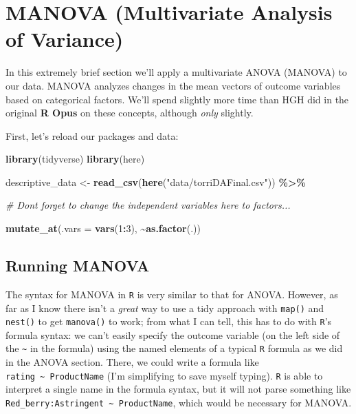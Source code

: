 \documentclass[
]{book}
\newenvironment{Shaded}{\begin{snugshade}}{\end{snugshade}}
\newcommand{\AttributeTok}[1]{\textcolor[rgb]{0.13,0.29,0.53}{#1}}
\newcommand{\CommentTok}[1]{\textcolor[rgb]{0.56,0.35,0.01}{\textit{#1}}}
\newcommand{\DecValTok}[1]{\textcolor[rgb]{0.00,0.00,0.81}{#1}}
\newcommand{\FunctionTok}[1]{\textcolor[rgb]{0.13,0.29,0.53}{\textbf{#1}}}
\newcommand{\NormalTok}[1]{#1}
\newcommand{\OtherTok}[1]{\textcolor[rgb]{0.56,0.35,0.01}{#1}}
\newcommand{\SpecialCharTok}[1]{\textcolor[rgb]{0.81,0.36,0.00}{\textbf{#1}}}
\newcommand{\StringTok}[1]{\textcolor[rgb]{0.31,0.60,0.02}{#1}}
\begin{document}
\chapter{MANOVA (Multivariate Analysis of Variance)}\label{manova-multivariate-analysis-of-variance}

In this extremely brief section we'll apply a multivariate ANOVA (MANOVA) to our data. MANOVA analyzes changes in the mean vectors of outcome variables based on categorical factors. We'll spend slightly more time than HGH did in the original \textbf{R Opus} on these concepts, although \emph{only} slightly.

First, let's reload our packages and data:

\begin{Shaded}
\begin{Highlighting}[]
\FunctionTok{library}\NormalTok{(tidyverse)}
\FunctionTok{library}\NormalTok{(here)}

\NormalTok{descriptive\_data }\OtherTok{\textless{}{-}} \FunctionTok{read\_csv}\NormalTok{(}\FunctionTok{here}\NormalTok{(}\StringTok{"data/torriDAFinal.csv"}\NormalTok{)) }\SpecialCharTok{\%\textgreater{}\%}
  
  \CommentTok{\# Don\textquotesingle{}t forget to change the independent variables here to factors...}
  
  \FunctionTok{mutate\_at}\NormalTok{(}\AttributeTok{.vars =} \FunctionTok{vars}\NormalTok{(}\DecValTok{1}\SpecialCharTok{:}\DecValTok{3}\NormalTok{), }\SpecialCharTok{\textasciitilde{}}\FunctionTok{as.factor}\NormalTok{(.))}
\end{Highlighting}
\end{Shaded}

\section{Running MANOVA}\label{running-manova}

The syntax for MANOVA in \texttt{R} is very similar to that for ANOVA. However, as far as I know there isn't a \emph{great} way to use a tidy approach with \texttt{map()} and \texttt{nest()} to get \texttt{manova()} to work; from what I can tell, this has to do with \texttt{R}'s formula syntax: we can't easily specify the outcome variable (on the left side of the \texttt{\textasciitilde{}} in the formula) using the named elements of a typical \texttt{R} formula as we did in the ANOVA section. There, we could write a formula like \texttt{rating\ \textasciitilde{}\ ProductName} (I'm simplifying to save myself typing). \texttt{R} is able to interpret a single name in the formula syntax, but it will not parse something like \texttt{Red\_berry:Astringent\ \textasciitilde{}\ ProductName}, which would be necessary for MANOVA.
\end{document}
